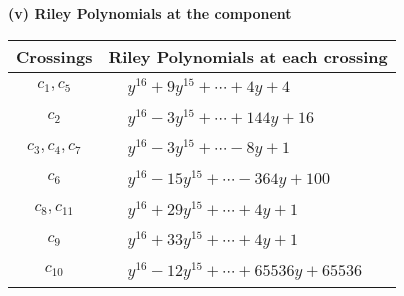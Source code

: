 \documentclass[1p]{elsarticle_modified}
\theoremstyle{definition}
\begin{document}
\newpage\renewcommand{\arraystretch}{1}
\flushleft \textbf{(v) Riley Polynomials at the component}\newline \\
\begin{tabular}{m{50pt}|m{274pt}}
Crossings & \hspace{64pt}Riley Polynomials at each crossing \\
\hline $$\begin{aligned}c_{1},c_{5}\end{aligned}$$&$\begin{aligned}
&y^{16}+9 y^{15}+\cdots+4 y+4
\end{aligned}$\\
\hline $$\begin{aligned}c_{2}\end{aligned}$$&$\begin{aligned}
&y^{16}-3 y^{15}+\cdots+144 y+16
\end{aligned}$\\
\hline $$\begin{aligned}c_{3},c_{4},c_{7}\end{aligned}$$&$\begin{aligned}
&y^{16}-3 y^{15}+\cdots-8 y+1
\end{aligned}$\\
\hline $$\begin{aligned}c_{6}\end{aligned}$$&$\begin{aligned}
&y^{16}-15 y^{15}+\cdots-364 y+100
\end{aligned}$\\
\hline $$\begin{aligned}c_{8},c_{11}\end{aligned}$$&$\begin{aligned}
&y^{16}+29 y^{15}+\cdots+4 y+1
\end{aligned}$\\
\hline $$\begin{aligned}c_{9}\end{aligned}$$&$\begin{aligned}
&y^{16}+33 y^{15}+\cdots+4 y+1
\end{aligned}$\\
\hline $$\begin{aligned}c_{10}\end{aligned}$$&$\begin{aligned}
&y^{16}-12 y^{15}+\cdots+65536 y+65536
\end{aligned}$\\
\hline
\end{tabular}\\~\\
\end{document}

